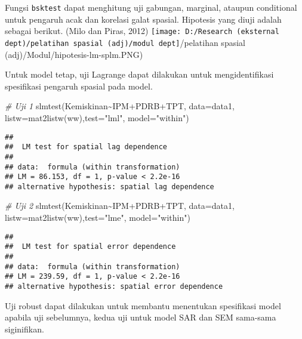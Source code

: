 \documentclass[
]{book}
\newenvironment{Shaded}{\begin{snugshade}}{\end{snugshade}}
\newcommand{\AttributeTok}[1]{\textcolor[rgb]{0.77,0.63,0.00}{#1}}
\newcommand{\CommentTok}[1]{\textcolor[rgb]{0.56,0.35,0.01}{\textit{#1}}}
\newcommand{\FunctionTok}[1]{\textcolor[rgb]{0.00,0.00,0.00}{#1}}
\newcommand{\NormalTok}[1]{#1}
\newcommand{\SpecialCharTok}[1]{\textcolor[rgb]{0.00,0.00,0.00}{#1}}
\newcommand{\StringTok}[1]{\textcolor[rgb]{0.31,0.60,0.02}{#1}}
\begin{document}
Fungsi \texttt{bsktest} dapat menghitung uji gabungan, marginal, ataupun conditional untuk pengaruh acak dan korelasi galat spasial. Hipotesis yang diuji adalah sebagai berikut. (Milo dan Piras, 2012)
\texttt{[image: D:/Research (eksternal dept)/pelatihan spasial (adj)/modul dept]}/pelatihan spasial (adj)/Modul/hipotesis-lm-splm.PNG)

Untuk model tetap, uji Lagrange dapat dilakukan untuk mengidentifikasi spesifikasi pengaruh spasial pada model.

\begin{Shaded}
\begin{Highlighting}[]
\CommentTok{\# Uji 1}
\FunctionTok{slmtest}\NormalTok{(Kemiskinan}\SpecialCharTok{\textasciitilde{}}\NormalTok{IPM}\SpecialCharTok{+}\NormalTok{PDRB}\SpecialCharTok{+}\NormalTok{TPT, }\AttributeTok{data=}\NormalTok{data1, }\AttributeTok{listw=}\FunctionTok{mat2listw}\NormalTok{(ww),}\AttributeTok{test=}\StringTok{"lml"}\NormalTok{, }\AttributeTok{model=}\StringTok{"within"}\NormalTok{)}
\end{Highlighting}
\end{Shaded}

\begin{verbatim}
## 
##  LM test for spatial lag dependence
## 
## data:  formula (within transformation)
## LM = 86.153, df = 1, p-value < 2.2e-16
## alternative hypothesis: spatial lag dependence
\end{verbatim}

\begin{Shaded}
\begin{Highlighting}[]
\CommentTok{\# Uji 2}
\FunctionTok{slmtest}\NormalTok{(Kemiskinan}\SpecialCharTok{\textasciitilde{}}\NormalTok{IPM}\SpecialCharTok{+}\NormalTok{PDRB}\SpecialCharTok{+}\NormalTok{TPT, }\AttributeTok{data=}\NormalTok{data1, }\AttributeTok{listw=}\FunctionTok{mat2listw}\NormalTok{(ww),}\AttributeTok{test=}\StringTok{"lme"}\NormalTok{, }\AttributeTok{model=}\StringTok{"within"}\NormalTok{)}
\end{Highlighting}
\end{Shaded}

\begin{verbatim}
## 
##  LM test for spatial error dependence
## 
## data:  formula (within transformation)
## LM = 239.59, df = 1, p-value < 2.2e-16
## alternative hypothesis: spatial error dependence
\end{verbatim}

Uji robust dapat dilakukan untuk membantu menentukan spesifikasi model apabila uji sebelumnya, kedua uji untuk model SAR dan SEM sama-sama siginifikan.
\end{document}
